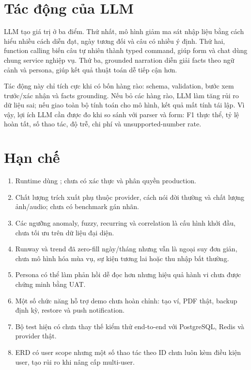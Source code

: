 \section{Tác động của LLM}

LLM tạo giá trị ở ba điểm. Thứ nhất, mô hình giảm ma sát nhập liệu bằng cách hiểu nhiều cách diễn đạt, ngày tương đối và câu có nhiều ý định. Thứ hai, function calling biến câu tự nhiên thành typed command, giúp form và chat dùng chung service nghiệp vụ. Thứ ba, grounded narration diễn giải facts theo ngữ cảnh và persona, giúp kết quả thuật toán dễ tiếp cận hơn.

Tác động này chỉ tích cực khi có bốn hàng rào: schema, validation, bước xem trước/xác nhận và facts grounding. Nếu bỏ các hàng rào, LLM làm tăng rủi ro dữ liệu sai; nếu giao toàn bộ tính toán cho mô hình, kết quả mất tính tái lập. Vì vậy, lợi ích LLM cần được đo khi so sánh với parser và form: F1 thực thể, tỷ lệ hoàn tất, số thao tác, độ trễ, chi phí và unsupported-number rate.

\section{Hạn chế}

\begin{enumerate}
  \item Runtime dùng ; chưa có xác thực và phân quyền production.
  \item Chất lượng trích xuất phụ thuộc provider, cách nói đời thường và chất lượng ảnh/audio; chưa có benchmark gán nhãn.
  \item Các ngưỡng anomaly, fuzzy, recurring và correlation là cấu hình khởi đầu, chưa tối ưu trên dữ liệu đại diện.
  \item Runway và trend đã zero-fill ngày/tháng nhưng vẫn là ngoại suy đơn giản, chưa mô hình hóa mùa vụ, sự kiện tương lai hoặc thu nhập bất thường.
  \item Persona có thể làm phản hồi dễ đọc hơn nhưng hiệu quả hành vi chưa được chứng minh bằng UAT.
  \item Một số chức năng hỗ trợ demo chưa hoàn chỉnh: tạo ví, PDF thật, backup định kỳ, restore và push notification.
  \item Bộ test hiện có chưa thay thế kiểm thử end-to-end với PostgreSQL, Redis và provider thật.
  \item ERD có user scope nhưng một số thao tác theo ID chưa luôn kèm điều kiện user, tạo rủi ro khi nâng cấp multi-user.
\end{enumerate}

